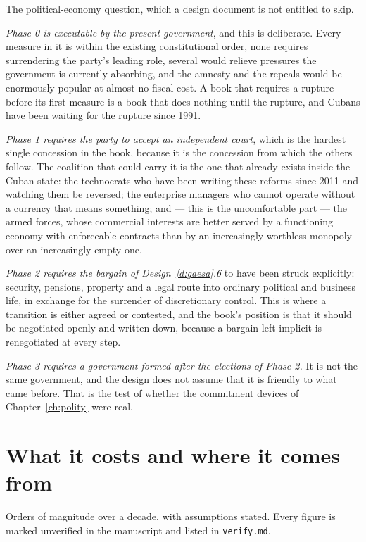 The political-economy question, which a design document is not entitled to skip.

\emph{Phase 0 is executable by the present government}, and this is deliberate.
Every measure in it is within the existing constitutional order, none requires
surrendering the party's leading role, several would relieve pressures the
government is currently absorbing, and the amnesty and the repeals would be
enormously popular at almost no fiscal cost. A book that requires a rupture
before its first measure is a book that does nothing until the rupture, and
Cubans have been waiting for the rupture since 1991.

\emph{Phase 1 requires the party to accept an independent court}, which is the
hardest single concession in the book, because it is the concession from which
the others follow. The coalition that could carry it is the one that already
exists inside the Cuban state: the technocrats who have been writing these
reforms since 2011 and watching them be reversed; the enterprise managers who
cannot operate without a currency that means something; and --- this is the
uncomfortable part --- the armed forces, whose commercial interests are better
served by a functioning economy with enforceable contracts than by an
increasingly worthless monopoly over an increasingly empty one.

\emph{Phase 2 requires the bargain of Design~\ref{d:gaesa}.6} to have been struck
explicitly: security, pensions, property and a legal route into ordinary
political and business life, in exchange for the surrender of discretionary
control. This is where a transition is either agreed or contested, and the book's
position is that it should be negotiated openly and written down, because a
bargain left implicit is renegotiated at every step.

\emph{Phase 3 requires a government formed after the elections of Phase 2.} It is
not the same government, and the design does not assume that it is friendly to
what came before. That is the test of whether the commitment devices of
Chapter~\ref{ch:polity} were real.

\section{What it costs and where it comes from}

Orders of magnitude over a decade, with assumptions stated. Every figure is
marked unverified in the manuscript and listed in \texttt{verify.md}.

